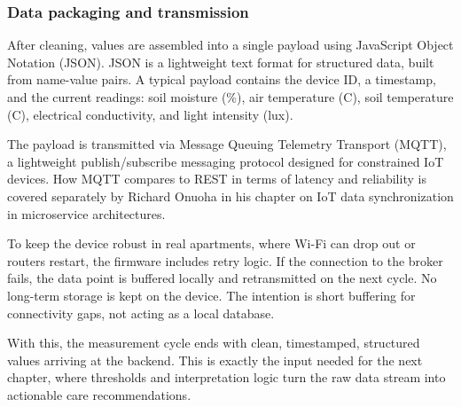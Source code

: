 \subsubsection*{Data packaging and transmission}

After cleaning, values are assembled into a single payload using JavaScript Object Notation (JSON). JSON is a lightweight text format for structured data, built from name-value pairs. \cite{rfcJSON} A typical payload contains the device ID, a timestamp, and the current readings: soil moisture (\%), air temperature (\textdegree C), soil temperature (\textdegree C), electrical conductivity, and light intensity (lux).

The payload is transmitted via Message Queuing Telemetry Transport (MQTT), a lightweight publish/subscribe messaging protocol designed for constrained IoT devices. \cite{oasisMQTT} How MQTT compares to REST in terms of latency and reliability is covered separately by Richard Onuoha in his chapter on IoT data synchronization in microservice architectures.

To keep the device robust in real apartments, where Wi-Fi can drop out or routers restart, the firmware includes retry logic. If the connection to the broker fails, the data point is buffered locally and retransmitted on the next cycle. No long-term storage is kept on the device. The intention is short buffering for connectivity gaps, not acting as a local database.

With this, the measurement cycle ends with clean, timestamped, structured values arriving at the backend. This is exactly the input needed for the next chapter, where thresholds and interpretation logic turn the raw data stream into actionable care recommendations.
